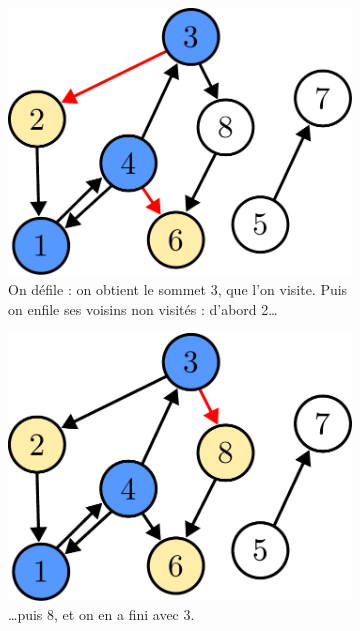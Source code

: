 \documentclass{article}
\begin{document}
\begin{itemize}
\begin{figure}[b]
		\begin{subfigure}[t]{0.3\linewidth}
			\centering
			\includegraphics[width=0.9\linewidth]{../figures/bfs7.pdf}
			\caption{On défile : on obtient le sommet 3, que l'on visite. Puis on enfile ses voisins non visités : d'abord 2\ldots}
		\end{subfigure}\hfill%
		\begin{subfigure}[t]{0.3\linewidth}
			\centering
			\includegraphics[width=0.9\linewidth]{../figures/bfs8.pdf}
			\caption{\ldots puis 8, et on en a fini avec 3.}
		\end{subfigure}\hfill%
		\begin{subfigure}[t]{0.3\linewidth}
			\centering

\end{subfigure}
\end{figure}
\end{itemize}
\end{document}
